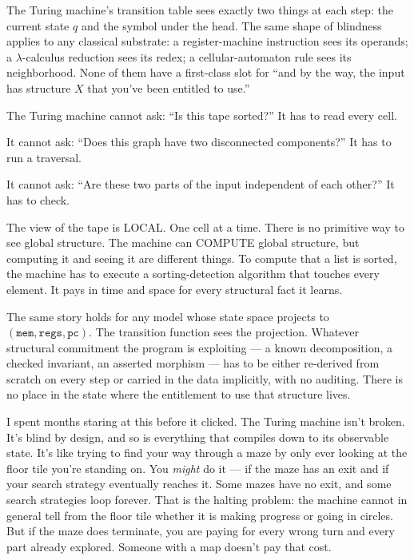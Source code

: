 \documentclass[11pt,a4paper]{article}
\theoremstyle{plain}
\theoremstyle{definition}
\theoremstyle{remark}
\begin{document}
The Turing machine's transition table sees exactly two things at each step: the current state $q$ and the symbol under the head. The same shape of blindness applies to any classical substrate: a register-machine instruction sees its operands; a $\lambda$-calculus reduction sees its redex; a cellular-automaton rule sees its neighborhood. None of them have a first-class slot for ``and by the way, the input has structure $X$ that you've been entitled to use.''

The Turing machine cannot ask: ``Is this tape sorted?'' It has to read every cell.

It cannot ask: ``Does this graph have two disconnected components?'' It has to run a traversal.

It cannot ask: ``Are these two parts of the input independent of each other?'' It has to check.

The view of the tape is LOCAL. One cell at a time. There is no primitive way to see global structure. The machine can COMPUTE global structure, but computing it and seeing it are different things. To compute that a list is sorted, the machine has to execute a sorting-detection algorithm that touches every element. It pays in time and space for every structural fact it learns.

The same story holds for any model whose state space projects to $(\texttt{mem}, \texttt{regs}, \texttt{pc})$. The transition function sees the projection. Whatever structural commitment the program is exploiting --- a known decomposition, a checked invariant, an asserted morphism --- has to be either re-derived from scratch on every step or carried in the data implicitly, with no auditing. There is no place in the state where the entitlement to use that structure lives.

I spent months staring at this before it clicked. The Turing machine isn't broken. It's blind by design, and so is everything that compiles down to its observable state. It's like trying to find your way through a maze by only ever looking at the floor tile you're standing on. You \emph{might} do it --- if the maze has an exit and if your search strategy eventually reaches it. Some mazes have no exit, and some search strategies loop forever. That is the halting problem: the machine cannot in general tell from the floor tile whether it is making progress or going in circles. But if the maze does terminate, you are paying for every wrong turn and every part already explored. Someone with a map doesn't pay that cost.
\end{document}
